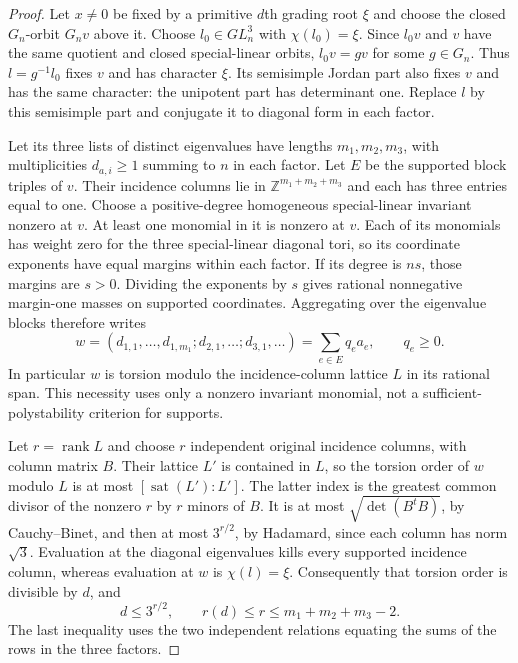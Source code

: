\begin{proof}
Let $x\ne0$ be fixed by a primitive $d$th grading root $\xi$ and
choose the closed $G_n$-orbit $G_nv$ above it. Choose $l_0\in GL_n^3$
with $\chi(l_0)=\xi$. Since $l_0v$ and $v$ have the same quotient
and closed special-linear orbits, $l_0v=gv$ for some $g\in G_n$.
Thus $l=g^{-1}l_0$ fixes $v$ and has character $\xi$. Its semisimple
Jordan part also fixes $v$ and has the same character: the unipotent
part has determinant one. Replace $l$ by this semisimple part and
conjugate it to diagonal form in each factor.

Let its three lists of distinct eigenvalues have lengths
$m_1,m_2,m_3$, with multiplicities $d_{a,i}\ge1$ summing to $n$
in each factor. Let $E$ be the supported block triples of $v$.
Their incidence columns lie in $\mathbb Z^{m_1+m_2+m_3}$ and each
has three entries equal to one. Choose a positive-degree homogeneous
special-linear invariant nonzero at $v$. At least one monomial in
it is nonzero at $v$. Each of its monomials has weight zero for the
three special-linear diagonal tori, so its coordinate exponents have
equal margins within each factor. If its degree is $ns$, those
margins are $s>0$. Dividing the exponents by $s$ gives rational
nonnegative margin-one masses on supported coordinates. Aggregating
over the eigenvalue blocks therefore writes
\[
       w=(d_{1,1},\ldots,d_{1,m_1};d_{2,1},\ldots;
                           d_{3,1},\ldots)
          =\sum_{e\in E}q_e a_e,
             \qquad q_e\ge0.                         \tag{PNEW-I4}
\]
In particular $w$ is torsion modulo the incidence-column lattice $L$
in its rational span. This necessity uses only a nonzero invariant
monomial, not a sufficient-polystability criterion for supports.

Let $r=\operatorname{rank}L$ and choose $r$ independent original
incidence columns, with column matrix $B$. Their lattice $L'$
is contained in $L$, so the torsion order of $w$ modulo $L$ is
at most $[\operatorname{sat}(L'):L']$. The latter index is the
greatest common divisor of the nonzero $r$ by $r$ minors of $B$.
It is at most $\sqrt{\det(B^tB)}$, by Cauchy--Binet, and then at
most $3^{r/2}$, by Hadamard, since each column has norm $\sqrt3$.
Evaluation at the diagonal eigenvalues kills every supported
incidence column, whereas evaluation at $w$ is $\chi(l)=\xi$.
Consequently that torsion order is divisible by $d$, and
\[
             d\le3^{r/2},\qquad
             r(d)\le r\le m_1+m_2+m_3-2.             \tag{PNEW-I5}
\]
The last inequality uses the two independent relations equating
the sums of the rows in the three factors.


\end{proof}
